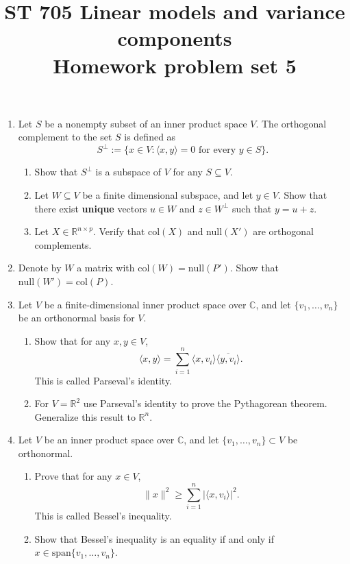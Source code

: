 \documentclass[11pt]{article}
\title{ST 705 Linear models and variance components \\ 
        Homework problem set 5}
\begin{document}
\maketitle

\begin{enumerate}

\item Let $S$ be a nonempty subset of an inner product space $V$.  The orthogonal complement to the set $S$ is defined as
\[
S^{\perp} := \{x \in V : \langle x,y\rangle = 0 \text{ for every } y \in S\}.
\]
\begin{enumerate}
\item Show that $S^{\perp}$ is a subspace of $V$ for any $S \subseteq V$.
\item Let $W \subseteq V$ be a finite dimensional subspace, and let $y \in V$.  Show that there exist \textbf{unique} vectors $u \in W$ and $z \in W^{\perp}$ such that $y = u + z$.
\item Let $X \in \mathbb{R}^{n\times p}$.  Verify that col$(X)$ and null$(X')$ are orthogonal complements.
\end{enumerate}

\item Denote by $W$ a matrix with $\text{col}(W) = \text{null}(P')$.  Show that $\text{null}(W') = \text{col}(P)$. 

\item Let $V$ be a finite-dimensional inner product space over $\mathbb{C}$, and let $\{v_{1},\dots,v_{n}\}$ be an orthonormal basis for $V$.  
\begin{enumerate}
\item Show that for any $x,y \in V$,
\[
\langle x,y\rangle = \sum_{i=1}^{n}\langle x,v_{i} \rangle\overline{\langle y,v_{i} \rangle}.
\]
This is called Parseval's identity.
\item For $V = \mathbb{R}^{2}$ use Parseval's identity to prove the Pythagorean theorem.  Generalize this result to $\mathbb{R}^{n}$.
\end{enumerate}

\item Let $V$ be an inner product space over $\mathbb{C}$, and let $\{v_{1},\dots,v_{n}\} \subset V$ be orthonormal.
\begin{enumerate}
\item Prove that for any $x \in V$,
\[
\|x\|^{2} \ge \sum_{i=1}^{n} |\langle x,v_{i}\rangle|^{2}.
\]
This is called Bessel's inequality.
\item Show that Bessel's inequality is an equality if and only if $x \in \text{span}\{v_{1},\dots,v_{n}\}$.
\end{enumerate}  


\end{enumerate}
\end{document}
